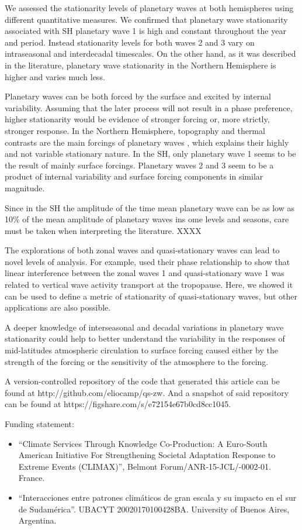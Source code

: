 \documentclass[draft,linenumbers]{agujournal2018}
\begin{document}
We assessed the stationarity levels of planetary waves at both
hemispheres using different quantitative measures. We confirmed that
planetary wave stationarity associated with SH planetary wave 1 is high
and constant throughout the year and period. Instead stationarity levels
for both waves 2 and 3 vary on intraseasonal and interdecadal
timescales. On the other hand, as it was described in the literature,
planetary wave stationarity in the Northern Hemisphere is higher and
varies much less.

Planetary waves can be both forced by the surface and excited by
internal variability. Assuming that the later process will not result in
a phase preference, higher stationarity would be evidence of stronger
forcing or, more strictly, stronger response. In the Northern
Hemisphere, topography and thermal contrasts are the main forcings of
planetary waves \citep{chen1988}, which explains their highly and not
variable stationary nature. In the SH, only planetary wave 1 seems to be
the result of mainly surface forcings. Planetary waves 2 and 3 seem to
be a product of internal variability and surface forcing components in
similar magnitude.

Since in the SH the amplitude of the time mean planetary wave can be as
low as 10\% of the mean amplitude of planetary waves ins ome levels and
seasons, care must be taken when interpreting the literature. XXXX

The explorations of both zonal waves and quasi-stationary waves can lead
to novel levels of analysis. For example, \citet{smith2012} used their
phase relationship to show that linear interference between the zonal
waves 1 and quasi-stationary wave 1 was related to vertical wave
activity transport at the tropopause. Here, we showed it can be used to
define a metric of stationarity of quasi-stationary waves, but other
applications are also possible.

A deeper knowledge of interseasonal and decadal variations in planetary
wave stationarity could help to better understand the variability in the
responses of mid-latitudes atmospheric circulation to surface forcing
caused either by the strength of the forcing or the sensitivity of the
atmosphere to the forcing.

\acknowledgments

A version-controlled repository of the code that generated this article
can be found at http://github.com/eliocamp/qs-zw. And a snapshot of said
repository can be found at https://figshare.com/s/e72154e67b0cd8cc1045.

Funding statement:

\begin{itemize}
\item
  ``Climate Services Through Knowledge Co-Production: A Euro-South
  American Initiative For Strengthening Societal Adaptation Response to
  Extreme Events (CLIMAX)'', Belmont Forum/ANR-15-JCL/-0002-01. France.
\item
  ``Interacciones entre patrones climáticos de gran escala y su impacto
  en el sur de Sudamérica''. UBACYT 20020170100428BA. University of
  Buenos Aires, Argentina.
\end{itemize}


\end{document}
